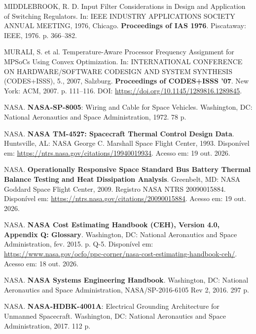 \vspace{0.2cm}
\noindent MIDDLEBROOK, R. D. Input Filter Considerations in Design and Application of Switching Regulators. In: IEEE INDUSTRY APPLICATIONS SOCIETY ANNUAL MEETING, 1976, Chicago. \textbf{Proceedings of IAS 1976}. Piscataway: IEEE, 1976. p. 366--382.

\vspace{0.2cm}
\noindent MURALI, S. et al. Temperature-Aware Processor Frequency Assignment for MPSoCs Using Convex Optimization. In: INTERNATIONAL CONFERENCE ON HARDWARE/SOFTWARE CODESIGN AND SYSTEM SYNTHESIS (CODES+ISSS), 5., 2007, Salzburg. \textbf{Proceedings of CODES+ISSS '07}. New York: ACM, 2007. p. 111--116. DOI: \url{https://doi.org/10.1145/1289816.1289845}.

\vspace{0.2cm}
\noindent NASA. \textbf{NASA-SP-8005}: Wiring and Cable for Space Vehicles. Washington, DC: National Aeronautics and Space Administration, 1972. 78 p.

\vspace{0.2cm}
\noindent NASA. \textbf{NASA TM-4527: Spacecraft Thermal Control Design Data}. Huntsville, AL: NASA George C. Marshall Space Flight Center, 1993. Disponível em: \url{https://ntrs.nasa.gov/citations/19940019934}. Acesso em: 19 out. 2026.

\vspace{0.2cm}
\noindent NASA. \textbf{Operationally Responsive Space Standard Bus Battery Thermal Balance Testing and Heat Dissipation Analysis}. Greenbelt, MD: NASA Goddard Space Flight Center, 2009. Registro NASA NTRS 20090015884. Disponível em: \url{https://ntrs.nasa.gov/citations/20090015884}. Acesso em: 19 out. 2026.

\vspace{0.2cm}
\noindent NASA. \textbf{NASA Cost Estimating Handbook (CEH), Version 4.0, Appendix Q: Glossary}. Washington, DC: National Aeronautics and Space Administration, fev. 2015. p. Q-5. Disponível em: \url{https://www.nasa.gov/ocfo/ppc-corner/nasa-cost-estimating-handbook-ceh/}. Acesso em: 18 out. 2026.

\vspace{0.2cm}
\noindent NASA. \textbf{NASA Systems Engineering Handbook}. Washington, DC: National Aeronautics and Space Administration, NASA/SP-2016-6105 Rev 2, 2016. 297 p.

\vspace{0.2cm}
\noindent NASA. \textbf{NASA-HDBK-4001A}: Electrical Grounding Architecture for Unmanned Spacecraft. Washington, DC: National Aeronautics and Space Administration, 2017. 112 p.


